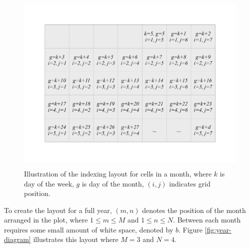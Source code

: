 \documentclass[article]{jss}
\theoremstyle{definition}
\theoremstyle{definition}
\theoremstyle{definition}
\theoremstyle{remark}
\begin{document}
\begin{CodeChunk}
\begin{figure}

{\centering \includegraphics[width=360pt,height=250pt]{figure/month} 

}

\caption[Illustration of the indexing layout for cells in
a month, where \(k\) is day of the week, \(g\) is day of the month,
\((i, j)\) indicates grid position.]{Illustration of the indexing layout for cells in
a month, where \(k\) is day of the week, \(g\) is day of the month,
\((i, j)\) indicates grid position.}\label{fig:month-diagram}
\end{figure}
\end{CodeChunk}





To create the layout for a full year, \((m, n)\) denotes the position of
the month arranged in the plot, where \(1 \le m \le M\) and
\(1 \le n \le N\). Between each month requires some small amount of
white space, denoted by \(b\). Figure \ref{fig:year-diagram} illustrates
this layout where \(M = 3\) and \(N = 4\).
\end{document}
